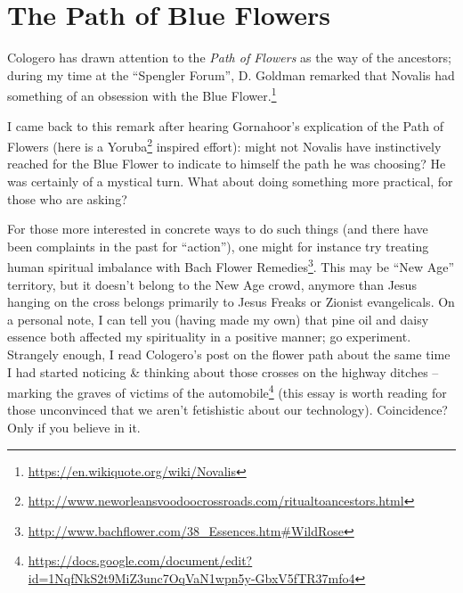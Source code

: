 \section{The Path of Blue Flowers}

Cologero has drawn attention to the \emph{Path of Flowers} as the way of the ancestors; during my time at the ``Spengler Forum'', D. Goldman remarked that Novalis had something of an obsession with the Blue Flower.\footnote{\url{https://en.wikiquote.org/wiki/Novalis}}

I came back to this remark after hearing Gornahoor's explication of the Path of Flowers (here is a Yoruba\footnote{\url{http://www.neworleansvoodoocrossroads.com/ritualtoancestors.html}} inspired effort): might not Novalis have instinctively reached for the Blue Flower to indicate to himself the path he was choosing? He was certainly of a mystical turn. What about doing something more practical, for those who are asking?

For those more interested in concrete ways to do such things (and there have been complaints in the past for ``action''), one might for instance try treating human spiritual imbalance with Bach Flower Remedies\footnote{\url{http://www.bachflower.com/38\_Essences.htm\#WildRose}}. This may be ``New Age'' territory, but it doesn't belong to the New Age crowd, anymore than Jesus hanging on the cross belongs primarily to Jesus Freaks or Zionist evangelicals. On a personal note, I can tell you (having made my own) that pine oil and daisy essence both affected my spirituality in a positive manner; go experiment. Strangely enough, I read Cologero's post on the flower path about the same time I had started noticing \& thinking about those crosses on the highway ditches -- marking the graves of victims of the automobile\footnote{\url{https://docs.google.com/document/edit?id=1NqfNkS2t9MiZ3unc7OqVaN1wpn5y-GbxV5fTR37mfo4}} (this essay is worth reading for those unconvinced that we aren't fetishistic about our technology). Coincidence? Only if you believe in it.

